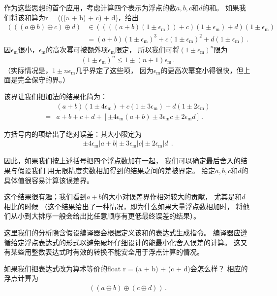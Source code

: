 作为这些思想的首个应用，考虑计算四个表示为浮点的数$a,b,c$和$d$的和。
如果我们将该和算为{\ttfamily r = (((a + b) + c) + d)}，给出
\begin{align*}
    (((a\oplus b)\oplus c)\oplus d) & \in((((a+b)(1\pm\epsilon_{\mathrm{m}}))+c)(1\pm\epsilon_{\mathrm{m}})+d)(1\pm\epsilon_{\mathrm{m}}) \\
                                    & =(a+b)(1\pm\epsilon_{\mathrm{m}})^3+c(1\pm\epsilon_{\mathrm{m}})^2+d(1\pm\epsilon_{\mathrm{m}})\, .
\end{align*}
因$\epsilon_{\mathrm{m}}$很小，$\epsilon_{\mathrm{m}}$的高次幂可被额外项$\epsilon_{\mathrm{m}}$限定，
所以我们可将$(1\pm\epsilon_{\mathrm{m}})^n$限为
\begin{align*}
    (1\pm\epsilon_{\mathrm{m}})^n\le1\pm(n+1)\epsilon_{\mathrm{m}}\, .
\end{align*}
（实际情况是，$1\pm n\epsilon_{\mathrm{m}}$几乎界定了这些项，
因为$\epsilon_{\mathrm{m}}$的更高次幂变小得很快，但上面是完全保守的界。）

该界让我们把加法的结果化简为：
\begin{align*}
      & (a+b)(1\pm4\epsilon_{\mathrm{m}})+c(1\pm3\epsilon_{\mathrm{m}})+d(1\pm2\epsilon_{\mathrm{m}})    \\
    = & a+b+c+d+[\pm4\epsilon_{\mathrm{m}}(a+b)\pm3\epsilon_{\mathrm{m}}c\pm2\epsilon_{\mathrm{m}}d]\, .
\end{align*}

方括号内的项给出了绝对误差：其大小限定为
\begin{align}\label{eq:3.10}
    \pm4\epsilon_{\mathrm{m}}|a+b|\pm3\epsilon_{\mathrm{m}}|c|\pm2\epsilon_{\mathrm{m}}|d|\, .
\end{align}

因此，如果我们按上述括号把四个浮点数加在一起，
我们可以确定最后舍入的结果与假设我们
用无限精度实数相加得到的结果之间的差被界定。
给定$a,b,c$和$d$的具体值很容易计算该误差界。

这个结果很有趣；我们看到$a+b$的大小对误差界作相对较大的贡献，
尤其是和$d$相比的时候
（这个结果给出了一种情况，即为什么如果大量浮点数相加时，
将他们从小到大排序一般会给出比任意顺序有更低最终误差的结果）。

这里我们的分析隐含假设编译器会根据定义该和的表达式生成指令。
编译器应遵循给定浮点表达式的形式以避免破坏仔细设计的能最小化舍入误差的计算。
这又有某些用整数表达式时有效的转换不能安全用于浮点计算的情况。

如果我们把表达式改为算术等价的{\ttfamily float r = (a + b) + (c + d)}会怎么样？
相应的浮点计算为
\begin{align*}
    ((a\oplus b)\oplus(c\oplus d))\, .
\end{align*}

